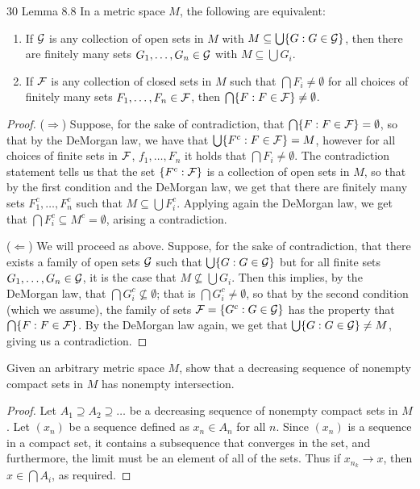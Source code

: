 \begin{exercise}{30 Lemma 8.8}
In a metric space $M$, the following are equivalent:
\begin{enumerate}
    \item If $\mathcal{G}$ is any collection of open sets in $M$ with $M\subseteq \bigcup\{G:G\in\mathcal{G}\}$, then there are finitely many sets $G_1,\dots, G_n \in \mathcal{G}$ with $M\subseteq \bigcup G_i$.
    \item If $\mathcal{F}$ is any collection of closed sets in $M$ such that $\bigcap F_i \neq \emptyset$ for all choices of finitely many sets $F_1,\dots, F_n\in \mathcal{F}$, then $\bigcap \{F:F\in\mathcal{F}\} \neq \emptyset$.
\end{enumerate}
\end{exercise}
\begin{proof}
($\Rightarrow$)
Suppose, for the sake of contradiction, that $\bigcap \{F:F\in\mathcal{F}\} = \emptyset$, so that by the DeMorgan law, we have that $\bigcup \{F^c:F\in\mathcal{F}\} = M$, however for all choices of finite sets in $\mathcal{F}$, $f_1,\dots,F_n$ it holds that $\bigcap F_i \neq \emptyset$.
The contradiction statement tells us that the set $\{F^c:\mathcal{F}\}$ is a collection of open sets in $M$, so that by the first condition and the DeMorgan law, we get that there are finitely many sets $F_1^c,\dots,F_n^c$ such that $M\subseteq \bigcup F_i^c$.
Applying again the DeMorgan law, we get that $\bigcap F_i^c \subseteq M^c = \emptyset$, arising a contradiction.

($\Leftarrow$)
We will proceed as above.
Suppose, for the sake of contradiction, that there exists a family of open sets $\mathcal{G}$ such that $\bigcup \{G:G \in \mathcal{G}\}$ but for all finite sets $G_1,\dots,G_n \in \mathcal{G}$, it is the case that $M\not\subseteq\bigcup G_i$.
Then this implies, by the DeMorgan law, that $\bigcap G_i^c \not\subseteq\emptyset$;
that is $\bigcap G_i^c \neq \emptyset$, so that by the second condition (which we assume), the family of sets $\mathcal{F} = \{G^c:G\in\mathcal{G}\}$ has the property that $\bigcap\{F:F\in\mathcal{F}\}$.
By the DeMorgan law again, we get that $\bigcup \{G: G\in\mathcal{G}\}\neq M$, giving us a contradiction.
\end{proof} 

\begin{exercise}{31}
Given an arbitrary metric space $M$, show that a decreasing sequence of nonempty compact sets in $M$ has nonempty intersection.
\end{exercise}
\begin{proof}
Let $A_1\supseteq A_2\supseteq \dots$ be a decreasing sequence of nonempty compact sets in $M$.
Let $(x_n)$ be a sequence defined as $x_n\in A_n$ for all $n$.
Since $(x_n)$ is a sequence in a compact set, it contains a subsequence that converges in the set, and furthermore, the limit must be an element of all of the sets.
Thus if $x_{n_k}\to x$, then $x\in\bigcap A_i$, as required.
\end{proof} 

